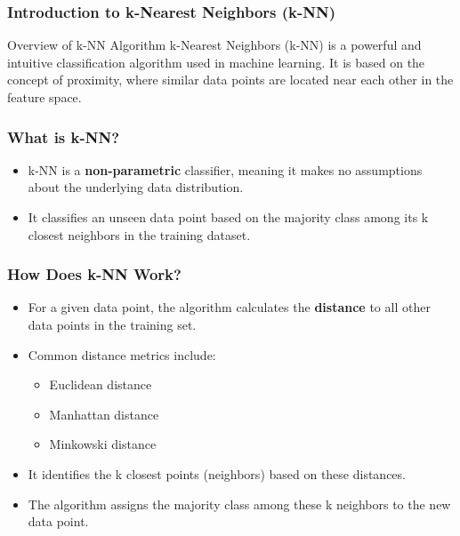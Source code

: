 \documentclass[aspectratio=169]{beamer}
\begin{document}
\begin{frame}[fragile]
    \frametitle{Introduction to k-Nearest Neighbors (k-NN)}
    \begin{block}{Overview of k-NN Algorithm}
        k-Nearest Neighbors (k-NN) is a powerful and intuitive classification algorithm used in machine learning. It is based on the concept of proximity, where similar data points are located near each other in the feature space.
    \end{block}
\end{frame}

\begin{frame}[fragile]
    \frametitle{What is k-NN?}
    \begin{itemize}
        \item k-NN is a \textbf{non-parametric} classifier, meaning it makes no assumptions about the underlying data distribution.
        \item It classifies an unseen data point based on the majority class among its k closest neighbors in the training dataset.
    \end{itemize}
\end{frame}

\begin{frame}[fragile]
    \frametitle{How Does k-NN Work?}
    \begin{itemize}
        \item For a given data point, the algorithm calculates the \textbf{distance} to all other data points in the training set.
        \item Common distance metrics include:
        \begin{itemize}
            \item Euclidean distance
            \item Manhattan distance
            \item Minkowski distance
        \end{itemize}
        \item It identifies the k closest points (neighbors) based on these distances.
        \item The algorithm assigns the majority class among these k neighbors to the new data point.
    \end{itemize}
\end{frame}
\end{document}
